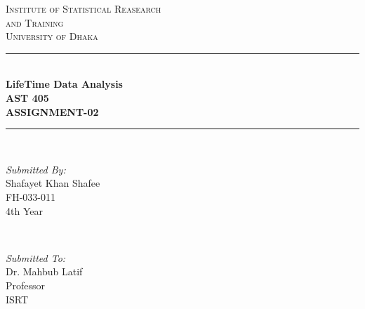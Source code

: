 \documentclass[12pt]{article}
\begin{document}
\begin{titlepage}

\newcommand{\HRule}{\rule{\linewidth}{0.5mm}} %

\center %


\textsc{\LARGE Institute of Statistical Reasearch}\\[0.3cm] %
\textsc{\LARGE and Training}\\[0.3cm]
\textsc{\LARGE University of Dhaka}\\[0.6cm]


\HRule \\[0.25cm]
{ \huge \bfseries LifeTime Data Analysis}\\[0.04cm]
{ \large \bfseries AST 405}\\[0.04cm]
{ \large \bfseries ASSIGNMENT-02}\\[0.03cm]
\HRule \\[1.5cm]



\begin{minipage}{0.4\textwidth}
\begin{flushleft} \large
\emph{Submitted By:}\\
Shafayet Khan Shafee \\FH-033-011\\4th Year
\end{flushleft}
\end{minipage}
~
\begin{minipage}{0.4\textwidth}
\begin{flushright} \large
\emph{Submitted To:} \\
Dr. Mahbub Latif\\Professor\\ISRT
\end{flushright}
\end{minipage}\\[1cm]


\end{titlepage}
\end{document}

